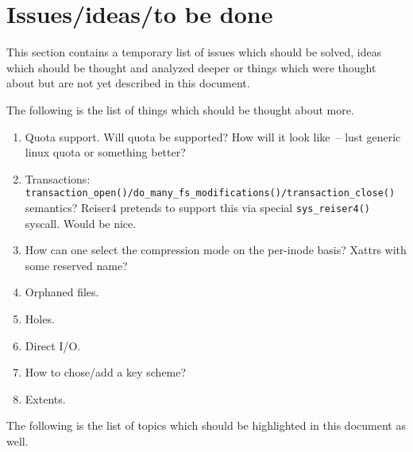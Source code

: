 \documentclass[12pt,a4paper,oneside,titlepage]{article}
\begin{document}


%
%
\section{Issues/ideas/to be done}

This section contains a temporary list of issues which should be solved, ideas
which should be thought and analyzed deeper or things which were thought about
but are not yet described in this document.

The following is the list of things which should be thought about more.

\begin{enumerate}

\item Quota support. Will quota be supported? How will it look like~-- lust
generic linux quota or something better?

\item Transactions:\\
\texttt{transaction\_open()/do\_many\_fs\_modifications()/transaction\_close()}
semantics? Reiser4 pretends to support this via special \texttt{sys\_reiser4()}
syscall. Would be nice.

\item How can one select the compression mode on the per-inode basis? Xattrs
with some reserved name?

\item Orphaned files.

\item Holes.

\item Direct I/O.

\item How to chose/add a key scheme?

\item Extents.

\end{enumerate}

The following is the list of topics which should be highlighted in this document
as well.
\end{document}
